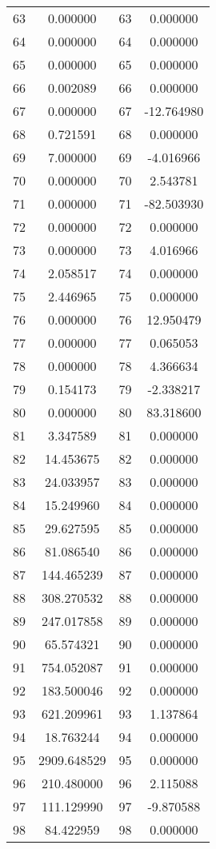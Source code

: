 \documentclass[12pt]{article}
\begin{document}
\begin{longtable}{@{}cccc@{}}
63 & 0.000000 & 63 & 0.000000 \\
64 & 0.000000 & 64 & 0.000000 \\
65 & 0.000000 & 65 & 0.000000 \\
66 & 0.002089 & 66 & 0.000000 \\
67 & 0.000000 & 67 & -12.764980 \\
68 & 0.721591 & 68 & 0.000000 \\
69 & 7.000000 & 69 & -4.016966 \\
70 & 0.000000 & 70 & 2.543781 \\
71 & 0.000000 & 71 & -82.503930 \\
72 & 0.000000 & 72 & 0.000000 \\
73 & 0.000000 & 73 & 4.016966 \\
74 & 2.058517 & 74 & 0.000000 \\
75 & 2.446965 & 75 & 0.000000 \\
76 & 0.000000 & 76 & 12.950479 \\
77 & 0.000000 & 77 & 0.065053 \\
78 & 0.000000 & 78 & 4.366634 \\
79 & 0.154173 & 79 & -2.338217 \\
80 & 0.000000 & 80 & 83.318600 \\
81 & 3.347589 & 81 & 0.000000 \\
82 & 14.453675 & 82 & 0.000000 \\
83 & 24.033957 & 83 & 0.000000 \\
84 & 15.249960 & 84 & 0.000000 \\
85 & 29.627595 & 85 & 0.000000 \\
86 & 81.086540 & 86 & 0.000000 \\
87 & 144.465239 & 87 & 0.000000 \\
88 & 308.270532 & 88 & 0.000000 \\
89 & 247.017858 & 89 & 0.000000 \\
90 & 65.574321 & 90 & 0.000000 \\
91 & 754.052087 & 91 & 0.000000 \\
92 & 183.500046 & 92 & 0.000000 \\
93 & 621.209961 & 93 & 1.137864 \\
94 & 18.763244 & 94 & 0.000000 \\
95 & 2909.648529 & 95 & 0.000000 \\
96 & 210.480000 & 96 & 2.115088 \\
97 & 111.129990 & 97 & -9.870588 \\
98 & 84.422959 & 98 & 0.000000 \\

\end{longtable}
\end{document}
